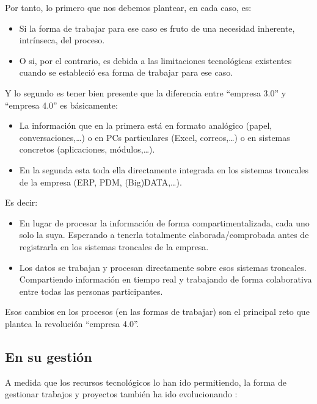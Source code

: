 \documentclass[spanish,12pt,a4paper,final,oneside]{book}
\begin{document}
Por tanto, lo primero que nos debemos plantear, en cada caso, es:
\begin{itemize}
\item Si la forma de trabajar para ese caso es fruto de una necesidad inherente, intrínseca, del proceso.
\item O si, por el contrario, es debida a las limitaciones tecnológicas existentes cuando se estableció esa forma de trabajar para ese caso. 
\end{itemize}

Y lo segundo es tener bien presente que la diferencia entre ``empresa 3.0'' y ``empresa 4.0'' es básicamente:
\begin{itemize}
\item La información que en la primera está en formato analógico (papel, conversaciones,\ldots) o en PCs particulares (Excel, correos,\ldots) o en sistemas concretos (aplicaciones, módulos,\ldots). 
\item En la segunda esta toda ella directamente integrada en los sistemas troncales de la empresa (ERP, PDM, (Big)DATA,\ldots). 
\end{itemize}

Es decir:
\begin{itemize}
\item En lugar de procesar la información de forma compartimentalizada, cada uno solo la suya. Esperando a tenerla totalmente elaborada/comprobada antes de registrarla en los sistemas troncales de la empresa.
\item Los datos se trabajan y procesan directamente sobre esos sistemas troncales. Compartiendo información en tiempo real y trabajando de forma colaborativa entre todas las personas participantes.
\end{itemize}

Esos cambios en los procesos (en las formas de trabajar) son el principal reto que plantea la revolución ``empresa 4.0''.


\subsection{En su gestión}
A medida que los recursos tecnológicos lo han ido permitiendo, la forma de gestionar trabajos y proyectos también ha ido evolucionando :
\end{document}
